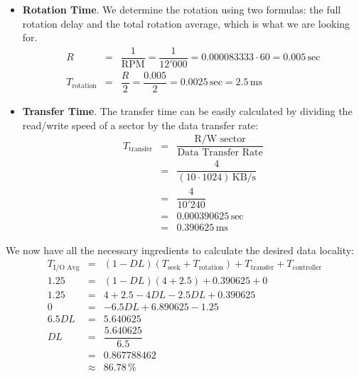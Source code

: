 \begin{enumerate}
    \newpage

    \begin{itemize}
        \item \textbf{Rotation Time}. We determine the rotation using two formulas: the full rotation delay and the total rotation average, which is what we are looking for.
        \begin{equation*}
            \begin{array}{rcl}
                R &=& \dfrac{1}{\text{RPM}} = \dfrac{1}{12'000} = 0.000083333 \cdot 60 = 0.005 \, \text{sec} \\ [1.3em]
                T_{\text{rotation}} &=& \dfrac{R}{2} = \dfrac{0.005}{2} = 0.0025 \, \text{sec} = 2.5 \, \text{ms}
            \end{array}
        \end{equation*}

        \item \textbf{Transfer Time}. The transfer time can be easily calculated by dividing the read/write speed of a sector by the data transfer rate:
        \begin{equation*}
            \begin{array}{rcl}
                T_{\text{transfer}} &=& \dfrac{\text{R/W sector}}{\text{Data Transfer Rate}} \\ [1.3em]
                &=& \dfrac{4}{\left(10 \cdot 1024\right) \, \text{KB/s}} \\ [1.3em]
                &=& \dfrac{4}{10'240} \\ [1.3em]
                &=& 0.000390625 \, \text{sec} \\ [.5em]
                &=& 0.390625 \, \text{ms}
            \end{array}
        \end{equation*}
    \end{itemize}
    We now have all the necessary ingredients to calculate the desired data locality:
    \begin{equation*}
        \begin{array}{rcl}
            T_{\text{I/O Avg}} &=& \left(1 - DL\right)\left(T_{\text{seek}} + T_{\text{rotation}}\right) + T_{\text{transfer}} + T_{\text{controller}} \\ [.5em]
            1.25 &=& \left(1-DL\right)\left(4 + 2.5\right) + 0.390625 + 0 \\ [.5em]
            1.25 &=& 4 + 2.5 - 4DL - 2.5DL + 0.390625 \\ [.5em]
            0 &=& - 6.5DL + 6.890625 - 1.25 \\ [.5em]
            6.5DL &=& 5.640625 \\ [.5em]
            DL &=& \dfrac{5.640625}{6.5} \\ [1.3em]
            &=& 0.867788462 \\ [.3em]
            &\approx& \mathbf{86.78 \, \%}
        \end{array}
    \end{equation*}


\end{enumerate}
